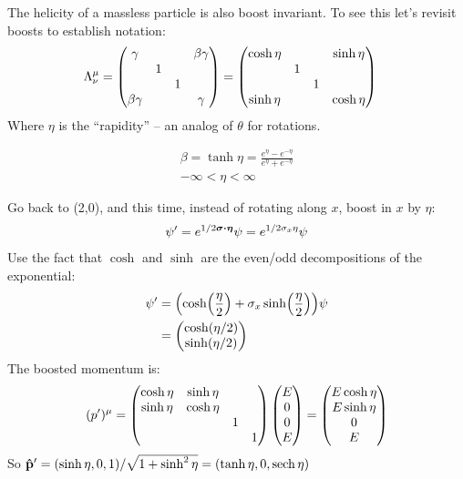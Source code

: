 The helicity of a massless particle is also boost invariant. To see this let's revisit boosts to establish notation:
\begin{align*}
  \Lambda^\mu_\nu&=\pmqty{\gamma&&&\beta\gamma\\&1\\&&1\\\beta\gamma&&&\gamma}
  =\pmqty{\cosh\eta&&&\sinh\eta\\&1\\&&1\\\sinh\eta&&&\cosh\eta}
\end{align*}
Where $\eta$ is the ``rapidity'' -- an analog of $\theta$ for rotations.

\begin{gather*}
  \beta=\tanh\eta=\frac{e^\eta-e^{-\eta}}{e^\eta+e^{-\eta}}\\
  -\infty<\eta<\infty
\end{gather*}

Go back to (2,0), and this time, instead of rotating along $x$, boost in $x$ by $\eta$:
\begin{align*}
  \psi'=e^{1/2\bm{\sigma}\vdot\bm{\eta}}\psi=e^{1/2\sigma_x\eta}\psi
\end{align*}
Use the fact that $\cosh$ and $\sinh$ are the even/odd decompositions of the exponential:
\begin{align*}
  \psi'&=\qty(\cosh(\frac\eta2)+\sigma_x\sinh(\frac\eta2))\psi\\
  &=\pmqty{\cosh(\eta/2)\\\sinh(\eta/2)}
\end{align*}
The boosted momentum is:
\begin{align*}
  (p')^\mu=\pmqty{\cosh\eta&\sinh\eta\\\sinh\eta&\cosh\eta\\&&1\\&&&1}
  \pmqty{E\\0\\0\\E}=\pmqty{E\cosh\eta\\E\sinh\eta\\0\\E}
\end{align*}
So $\vu{p}'=(\sinh\eta,0,1)/\sqrt{1+\sinh^2\eta}=(\tanh\eta,0,\sech\eta)$

